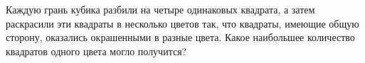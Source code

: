 Каждую грань кубика разбили на четыре одинаковых квадрата, а затем раскрасили эти квадраты в несколько цветов так, что квадраты, имеющие общую сторону, оказались окрашенными в разные цвета. Какое наибольшее количество квадратов одного цвета могло получится?